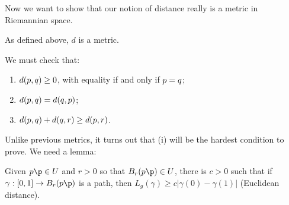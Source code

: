 Now we want to show that our notion of distance really is a metric in Riemannian space.

\begin{proposition}
	As defined above, $d$ is a metric.
\end{proposition}

\begin{proof*}
	We must check that:
	\begin{enumerate}
		\shortskip
		\item $d(p,q) \geq 0$, with equality if and only if $p=q$;
		\item $d(p,q) = d(q,p)$;
		\item $d(p,q) + d(q,r) \geq d(p,r)$.
	\end{enumerate}
	Unlike previous metrics, it turns out that (i) will be the hardest condition to prove. We need a lemma:
\end{proof*}

\begin{lemma}
	Given $\pp\p\in U$ and $r>0$ so that $B_r(\pp\p)\in U$, there is $c>0$ such that if $\gamma:[0,1] \to B_r(\pp\p)$ is a path, then $L_g(\gamma) \geq c\left\vert \gamma(0)-\gamma(1) \right\vert$ (Euclidean distance).
\end{lemma}

